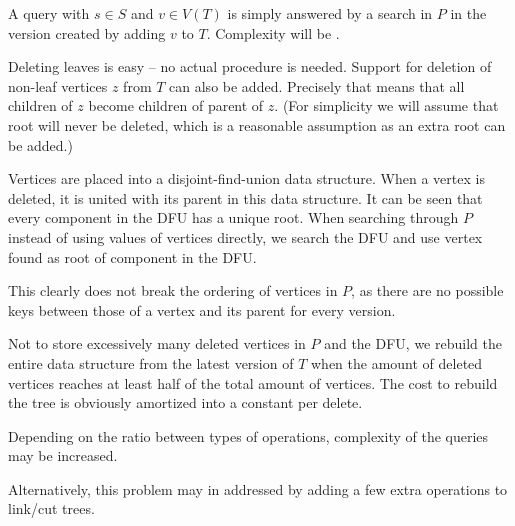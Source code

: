 A query with $s \in S$ and $v \in V(T)$ is simply answered by a search in $P$ in the version created by adding $v$ to $T$. Complexity will be .

Deleting leaves is easy -- no actual procedure is needed. Support for deletion of non-leaf vertices $z$ from $T$ can also be added. Precisely that means that all children of $z$ become children of parent of $z$. (For simplicity we will assume that root will never be deleted, which is a reasonable assumption as an extra root can be added.) 

Vertices are placed into a disjoint-find-union data structure. When a vertex is deleted, it is united with its parent in this data structure. It can be seen that every component in the DFU has a unique root. When searching through $P$ instead of using values of vertices directly, we search the DFU and use vertex found as root of component in the DFU.

This clearly does not break the ordering of vertices in $P$, as there are no possible keys between those of a vertex and its parent for every version. 
 
Not to store excessively many deleted vertices in $P$ and the DFU, we rebuild the entire data structure from the latest version of $T$ when the amount of deleted vertices reaches at least half of the total amount of vertices. The cost to rebuild the tree is obviously amortized into a constant per delete.
 
Depending on the ratio between types of operations, complexity of the queries may be increased. %

Alternatively, this problem may in addressed by adding a few extra operations to link/cut trees\cite{link-cut}.


